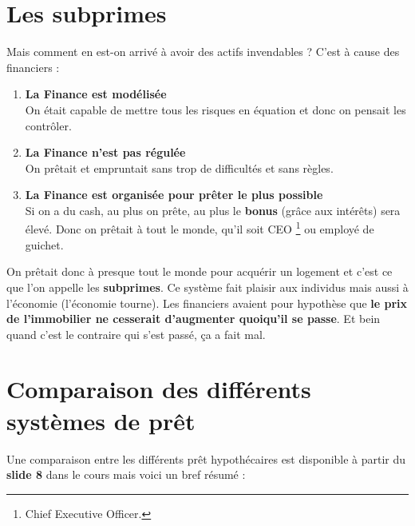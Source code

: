 \section{Les subprimes}
Mais comment en est-on arrivé à avoir des actifs invendables ? C'est à cause des financiers : 

\begin{enumerate}
	\item \textbf{La Finance est modélisée}\\
	      On était capable de mettre tous les risques en équation et donc on pensait les contrôler. 
	      
	\item \textbf{La Finance n'est pas régulée}\\
	      On prêtait et empruntait sans trop de difficultés et sans règles.
	      
	\item \textbf{La Finance est organisée pour prêter le plus possible}\\
	      Si on a du cash, au plus on prête, au plus le \textbf{bonus} (grâce aux intérêts) sera élevé. Donc on prêtait à tout le monde, qu'il soit CEO \footnote{Chief Executive Officer.} ou employé de guichet.
\end{enumerate}
 
On prêtait donc à presque tout le monde pour acquérir un logement et c'est ce que l'on appelle les \textbf{subprimes}. Ce système fait plaisir aux individus mais aussi à l'économie (l'économie tourne). Les financiers avaient pour hypothèse que \textbf{le prix de l'immobilier ne cesserait d'augmenter quoiqu'il se passe}. Et bein quand c'est le contraire qui s'est passé, ça a fait mal.

\section{Comparaison des différents systèmes de prêt}
Une comparaison entre les différents prêt hypothécaires est disponible à partir du \textbf{slide 8} dans le cours mais voici un bref résumé :

